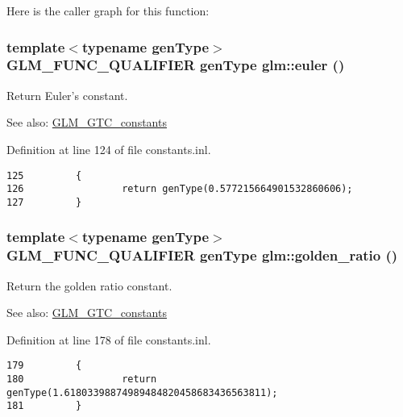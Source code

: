 Here is the caller graph for this function:\hypertarget{group__gtc__constants_g99cfc0dd627ebc20b51d3c9c0f706c6a}{
\subsubsection[euler]{\setlength{\rightskip}{0pt plus 5cm}template$<$typename genType$>$ GLM\_\-FUNC\_\-QUALIFIER genType glm::euler ()}}
\label{group__gtc__constants_g99cfc0dd627ebc20b51d3c9c0f706c6a}


Return Euler's constant. \begin{Desc}
\item[See also:]\hyperlink{group__gtc__constants}{GLM\_\-GTC\_\-constants} \end{Desc}


Definition at line 124 of file constants.inl.

\begin{Code}\begin{verbatim}125         {
126                 return genType(0.577215664901532860606);
127         }
\end{verbatim}
\end{Code}


\hypertarget{group__gtc__constants_g8a045109452784d20481cd2ac053c4e0}{
\subsubsection[golden\_\-ratio]{\setlength{\rightskip}{0pt plus 5cm}template$<$typename genType$>$ GLM\_\-FUNC\_\-QUALIFIER genType glm::golden\_\-ratio ()}}
\label{group__gtc__constants_g8a045109452784d20481cd2ac053c4e0}


Return the golden ratio constant. \begin{Desc}
\item[See also:]\hyperlink{group__gtc__constants}{GLM\_\-GTC\_\-constants} \end{Desc}


Definition at line 178 of file constants.inl.

\begin{Code}\begin{verbatim}179         {
180                 return genType(1.61803398874989484820458683436563811);
181         }
\end{verbatim}
\end{Code}


